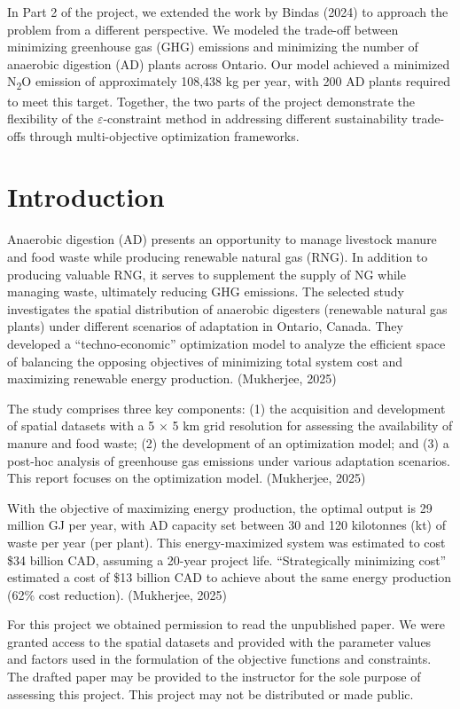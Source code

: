 \documentclass[12pt]{article}
\begin{document}
In Part 2 of the project, we extended the work by Bindas (2024) to approach the problem from a different perspective. We modeled the trade-off between minimizing greenhouse gas (GHG) emissions and minimizing the number of anaerobic digestion (AD) plants across Ontario. Our model achieved a minimized N\textsubscript{2}O emission of approximately 108,438 kg per year, with 200 AD plants required to meet this target. Together, the two parts of the project demonstrate the flexibility of the $\varepsilon$-constraint method in addressing different sustainability trade-offs through multi-objective optimization frameworks.


\section{Introduction}
Anaerobic digestion (AD) presents an opportunity to manage livestock manure and food waste while producing renewable natural gas (RNG). In addition to producing valuable RNG, it serves to supplement the supply of NG while managing waste, ultimately reducing GHG emissions. 
The selected study investigates the spatial distribution of anaerobic digesters (renewable natural gas plants) under different scenarios of adaptation in Ontario, Canada. They developed a “techno-economic” optimization model to analyze the efficient space of balancing the opposing objectives of minimizing total system cost and maximizing renewable energy production. (Mukherjee, 2025) 

The study comprises three key components: (1) the acquisition and development of spatial datasets with a 5 × 5 km grid resolution for assessing the availability of manure and food waste; (2) the development of an optimization model; and (3) a post-hoc analysis of greenhouse gas emissions under various adaptation scenarios. This report focuses on the optimization model. (Mukherjee, 2025) 

With the objective of maximizing energy production, the optimal output is 29 million GJ per year, with AD capacity set between 30 and 120 kilotonnes (kt) of waste per year (per plant). This energy-maximized system was estimated to cost \$34 billion CAD, assuming a 20-year project life. “Strategically minimizing cost” estimated a cost of \$13 billion CAD to achieve about the same energy production (62\% cost reduction). (Mukherjee, 2025) 

For this project we obtained permission to read the unpublished paper. We were granted access to the spatial datasets and provided with the parameter values and factors used in the formulation of the objective functions and constraints. The drafted paper may be provided to the instructor for the sole purpose of assessing this project. This project may not be distributed or made public.
\end{document}
